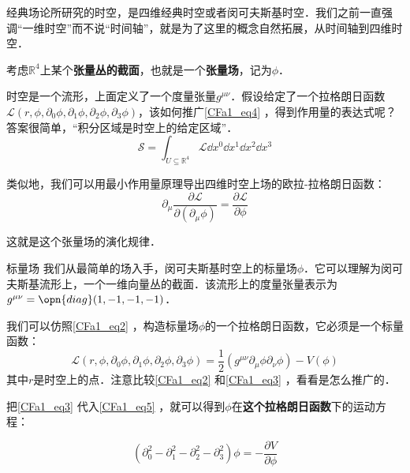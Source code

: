 经典场论所研究的时空，是四维经典时空或者闵可夫斯基时空．我们之前一直强调“一维时空”而不说“时间轴”，就是为了这里的概念自然拓展，从时间轴到四维时空．



考虑$\mathbb{R}^4$上某个\textbf{张量丛的截面}，也就是一个\textbf{张量场}，记为$\phi$．

时空是一个流形，上面定义了一个度量张量$g^{\mu\nu}$．假设给定了一个拉格朗日函数$\mathcal{L}(r, \phi, \partial_0\phi, \partial_1\phi, \partial_2\phi, \partial_3\phi)$，该如何推广\autoref{CFa1_eq4} ，得到作用量的表达式呢？答案很简单，“积分区域是时空上的给定区域”．
\begin{equation}
\mathcal{S} = \int_{U\subseteq \mathbb{R}^4} \mathcal{L}\dd x^0\dd x^1\dd x^2\dd x^3
\end{equation}

类似地，我们可以用最小作用量原理导出四维时空上场的欧拉-拉格朗日函数：
\begin{equation}\label{CFa1_eq5}
\partial_\mu \frac{\partial\mathcal{L}}{\partial(\partial_\mu \phi)} = \frac{\partial\mathcal{L}}{\partial \phi}
\end{equation}

这就是这个张量场的演化规律．

\begin{example}{标量场}
我们从最简单的场入手，闵可夫斯基时空上的标量场$\phi$．它可以理解为闵可夫斯基流形上，一个一维向量丛的截面．该流形上的度量张量表示为$g^{\mu\nu}=\opn{diag}(1, -1, -1, -1)$．

我们可以仿照\autoref{CFa1_eq2} ，构造标量场$\phi$的一个拉格朗日函数，它必须是一个标量函数：
\begin{equation}\label{CFa1_eq3}
\mathcal{L}(r, \phi, \partial_0\phi, \partial_1\phi, \partial_2\phi, \partial_3\phi) = \frac{1}{2}(g^{\mu\nu}\partial_\mu\phi \partial_\nu\phi) - V(\phi)
\end{equation}
其中$r$是时空上的点．注意比较\autoref{CFa1_eq2} 和\autoref{CFa1_eq3} ，看看是怎么推广的．

把\autoref{CFa1_eq3} 代入\autoref{CFa1_eq5} ，就可以得到$\phi$在\textbf{这个拉格朗日函数}下的运动方程：

\begin{equation}
(\partial^2_0-\partial^2_1-\partial^2_2-\partial^2_3)\phi = -\frac{\partial V}{\partial \phi}
\end{equation}

\end{example}












